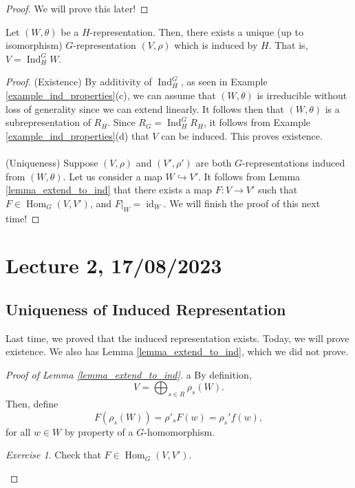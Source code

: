 \documentclass[a4paper]{report}
\theoremstyle{definition}
\theoremstyle{remark}
\theoremstyle{proposition}
\theoremstyle{conjecture}
\theoremstyle{lemma}
\theoremstyle{corollary}
\theoremstyle{exercise}
\newtheorem{exercise}{Exercise}
\theoremstyle{example}
\newcommand{\on}{\operatorname}
\begin{document}
\begin{proof}
    We will prove this later!
\end{proof}

\begin{theorem}
    Let $(W,\theta)$ be a $H$-representation. Then, there exists a unique
    (up to isomorphism) $G$-representation $(V,\rho)$ which is induced by 
    $H$. That is, $V = \on{Ind}_H^GW$.
\end{theorem}

\begin{proof}
    (Existence) By additivity of $\on{Ind}_H^G$, as seen in Example 
    \ref{example_ind_properties}(c), we can assume that $(W,\theta)$ 
    is irreducible without loss of generality since we can extend linearly.
    It follows then that $(W,\theta)$ is a subrepresentation of $R_H$.
    Since $R_G = \on{Ind}_H^GR_H$, it follows from 
    Example \ref{example_ind_properties}(d) that $V$ can be 
    induced. This proves existence.\\\\
    (Uniqueness) Suppose $(V,\rho)$ and $(V',\rho')$ are both 
    $G$-representations induced from $(W,\theta)$. Let us consider 
    a map $W \hookrightarrow V'$. It follows from Lemma \ref{lemma_extend_to_ind}
    that there exists a map $F: V \to V'$ such that $F \in \on{Hom}_G(V,V')$,
    and $F\vert_W = \on{id}_W$. We will finish the proof of this next time!
\end{proof}

\section{Lecture 2, 17/08/2023}

\subsection{Uniqueness of Induced Representation}

Last time, we proved that the induced representation exists. Today, we
will prove existence. We also has Lemma \ref{lemma_extend_to_ind},
which we did not prove.

\begin{proof}[Proof of Lemma \ref{lemma_extend_to_ind}]a
    By definition, 
    $$V = \bigoplus_{s \in R} \rho_s(W).$$
    Then, define $$F(\rho_s(W)) = \rho'_sF(w) = \rho_s'f(w),$$
    for all $w\in W$ by property of a $G$-homomorphism.
    \begin{exercise}
        Check that $F \in \on{Hom}_G(V,V')$.
    \end{exercise}
\end{proof}
\end{document}
